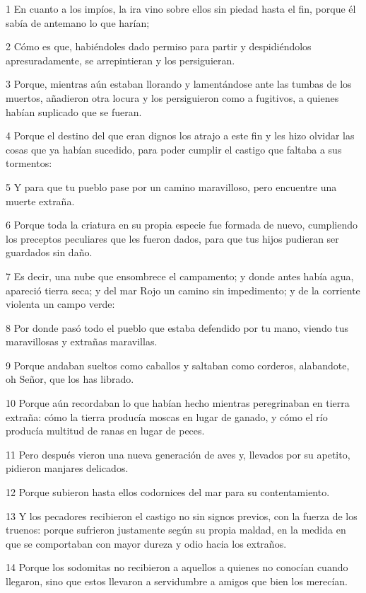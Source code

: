\par 1 En cuanto a los impíos, la ira vino sobre ellos sin piedad hasta el fin, porque él sabía de antemano lo que harían;
\par 2 Cómo es que, habiéndoles dado permiso para partir y despidiéndolos apresuradamente, se arrepintieran y los persiguieran.
\par 3 Porque, mientras aún estaban llorando y lamentándose ante las tumbas de los muertos, añadieron otra locura y los persiguieron como a fugitivos, a quienes habían suplicado que se fueran.
\par 4 Porque el destino del que eran dignos los atrajo a este fin y les hizo olvidar las cosas que ya habían sucedido, para poder cumplir el castigo que faltaba a sus tormentos:
\par 5 Y para que tu pueblo pase por un camino maravilloso, pero encuentre una muerte extraña.
\par 6 Porque toda la criatura en su propia especie fue formada de nuevo, cumpliendo los preceptos peculiares que les fueron dados, para que tus hijos pudieran ser guardados sin daño.
\par 7 Es decir, una nube que ensombrece el campamento; y donde antes había agua, apareció tierra seca; y del mar Rojo un camino sin impedimento; y de la corriente violenta un campo verde:
\par 8 Por donde pasó todo el pueblo que estaba defendido por tu mano, viendo tus maravillosas y extrañas maravillas.
\par 9 Porque andaban sueltos como caballos y saltaban como corderos, alabandote, oh Señor, que los has librado.
\par 10 Porque aún recordaban lo que habían hecho mientras peregrinaban en tierra extraña: cómo la tierra producía moscas en lugar de ganado, y cómo el río producía multitud de ranas en lugar de peces.
\par 11 Pero después vieron una nueva generación de aves y, llevados por su apetito, pidieron manjares delicados.
\par 12 Porque subieron hasta ellos codornices del mar para su contentamiento.
\par 13 Y los pecadores recibieron el castigo no sin signos previos, con la fuerza de los truenos: porque sufrieron justamente según su propia maldad, en la medida en que se comportaban con mayor dureza y odio hacia los extraños.
\par 14 Porque los sodomitas no recibieron a aquellos a quienes no conocían cuando llegaron, sino que estos llevaron a servidumbre a amigos que bien los merecían.
